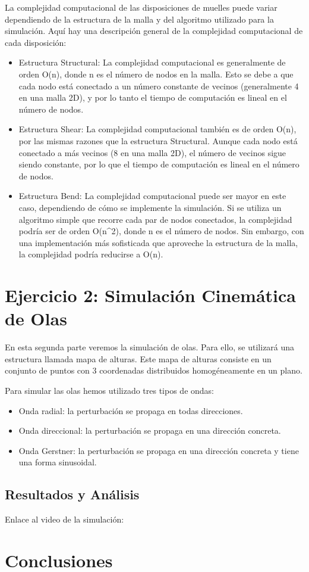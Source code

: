 \documentclass{article}
\begin{document}
La complejidad computacional de las disposiciones de muelles puede variar dependiendo de la estructura de la malla y del algoritmo utilizado para la simulación. Aquí hay una descripción general de la complejidad computacional de cada disposición:
\begin{itemize}
    \item Estructura Structural: La complejidad computacional es generalmente de orden O(n), donde n es el número de nodos en la malla. Esto se debe a que cada nodo está conectado a un número constante de vecinos (generalmente 4 en una malla 2D), y por lo tanto el tiempo de computación es lineal en el número de nodos.
    \item Estructura Shear: La complejidad computacional también es de orden O(n), por las mismas razones que la estructura Structural. Aunque cada nodo está conectado a más vecinos (8 en una malla 2D), el número de vecinos sigue siendo constante, por lo que el tiempo de computación es lineal en el número de nodos.
    \item Estructura Bend: La complejidad computacional puede ser mayor en este caso, dependiendo de cómo se implemente la simulación. Si se utiliza un algoritmo simple que recorre cada par de nodos conectados, la complejidad podría ser de orden O(n^2), donde n es el número de nodos. Sin embargo, con una implementación más sofisticada que aproveche la estructura de la malla, la complejidad podría reducirse a O(n).
\end{itemize}


\section{Ejercicio 2: Simulación Cinemática de Olas}\label{sec:ejercicio2}

En esta segunda parte veremos la simulación de olas. Para ello, se utilizará una estructura llamada mapa de alturas.
Este mapa de alturas consiste en un conjunto de puntos con 3 coordenadas distribuidos homogéneamente en un plano.

Para simular las olas hemos utilizado tres tipos de ondas:
\begin{itemize}
    \item Onda radial: la perturbación se propaga en todas direcciones.
    \item Onda direccional: la perturbación se propaga en una dirección concreta.
    \item Onda Gerstner: la perturbación se propaga en una dirección concreta y tiene una forma sinusoidal.
\end{itemize}

\subsection{Resultados y Análisis}\label{sec:fb-resultados2}

Enlace al video de la simulación: \url{}

\newpage
\section{Conclusiones}\label{sec:conclusion}
\end{document}
